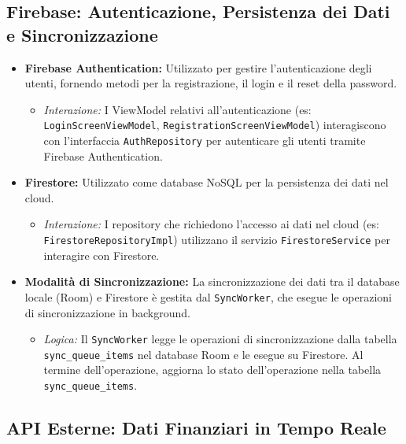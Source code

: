\documentclass{article}
\begin{document}
\subsection{Firebase: Autenticazione, Persistenza dei Dati e Sincronizzazione}

\begin{itemize}
    \item \textbf{Firebase Authentication:} Utilizzato per gestire l'autenticazione degli utenti, fornendo metodi per la registrazione, il login e il reset della password.
    \begin{itemize}
        \item \textit{Interazione:} I ViewModel relativi all'autenticazione (es: \texttt{LoginScreenViewModel}, \texttt{RegistrationScreenViewModel}) interagiscono con l'interfaccia \texttt{AuthRepository} per autenticare gli utenti tramite Firebase Authentication.
    \end{itemize}
    \item \textbf{Firestore:} Utilizzato come database NoSQL per la persistenza dei dati nel cloud.
    \begin{itemize}
        \item \textit{Interazione:} I repository che richiedono l'accesso ai dati nel cloud (es: \texttt{FirestoreRepositoryImpl}) utilizzano il servizio \texttt{FirestoreService} per interagire con Firestore.
    \end{itemize}
    \item \textbf{Modalità di Sincronizzazione:} La sincronizzazione dei dati tra il database locale (Room) e Firestore è gestita dal \texttt{SyncWorker}, che esegue le operazioni di sincronizzazione in background.
    \begin{itemize}
        \item \textit{Logica:} Il \texttt{SyncWorker} legge le operazioni di sincronizzazione dalla tabella \texttt{sync\_queue\_items} nel database Room e le esegue su Firestore. Al termine dell'operazione, aggiorna lo stato dell'operazione nella tabella \texttt{sync\_queue\_items}.
    \end{itemize}
\end{itemize}

\subsection{API Esterne: Dati Finanziari in Tempo Reale}
\end{document}
